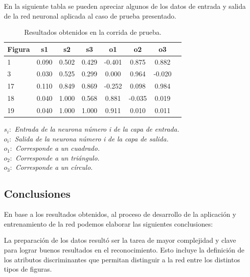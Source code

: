 \documentclass[pdftex,a4paper,10.5pt]{article}
\begin{document}

En la siguiente tabla se pueden apreciar algunos de los datos de entrada y salida de la red neuronal aplicada al caso de prueba presentado.

\begin{table}[ht]
\centering
\begin{tabular}{|l|c|c|c|c|c|c|c|}
  \hline                       
  \textbf{Figura} & \textbf{s1} & \textbf{s2} & \textbf{s3} & \textbf{o1} & \textbf{o2} & \textbf{o3}\\
  \hline
1 & 0.090 & 0.502 & 0.429 & -0.401 & 0.875 & 0.882\\
\hline
3 & 0.030 & 0.525 & 0.299 & 0.000 & 0.964 & -0.020\\
\hline
17 & 0.110 & 0.849 & 0.869 & -0.252 & 0.098 & 0.984\\
\hline
18 & 0.040 & 1.000 & 0.568 & 0.881 & -0.035 & 0.019\\
\hline
19 & 0.040 & 1.000 & 1.000 & 0.911 & 0.010 & 0.011\\

\hline
\end{tabular}	 
\caption{Resultados obtenidos en la corrida de prueba.}
\end{table}

\begin{flushleft}
  $ s_{i}:  $	 \textit{ Entrada de la neurona n\'umero i de la capa de entrada.}\\
  $ o_{i}:  $	 \textit{ Salida de la neurona n\'umero i de la capa de salida. }\\
  $ o_{1}:  $	 \textit{ Corresponde a un cuadrado.}\\
  $ o_{2}:  $	 \textit{ Corresponde a un tri\'angulo.}\\
  $ o_{3}:  $	 \textit{ Corresponde a un c\'irculo.}\\
\end{flushleft}

	        

\newpage
\subsection{Conclusiones} %

	En base a los resultados obtenidos, al proceso de desarrollo de la aplicaci\'on y
	entrenamiento de la red podemos elaborar las siguientes conclusiones:
	
	La preparaci\'on de los datos result\'o ser la tarea de mayor complejidad y clave para
	lograr buenos resultados en el reconocimiento. Esto incluye la definici\'on de los atributos
	discriminantes que permitan distinguir a la red entre los distintos tipos de figuras.
	
\end{document}
